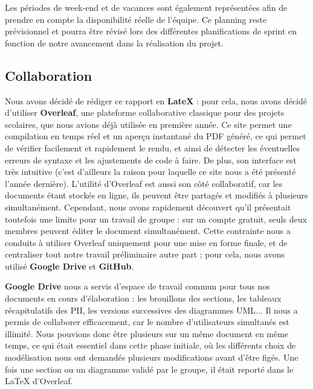 \documentclass[12pt,a4paper]{article}
\begin{document}
Les périodes de week-end et de vacances sont également représentées afin de
prendre en compte la disponibilité réelle de l'équipe. Ce planning reste
prévisionnel et pourra être révisé lors des différentes planifications de sprint en fonction de notre avancement dans la réalisation du projet.

\subsection{Collaboration}
Nous avons décidé de rédiger ce rapport en \textbf{LateX} : pour cela, nous avons décidé d’utiliser \textbf{Overleaf}, une plateforme collaborative classique pour des projets scolaires, que nous avions déjà utilisée en première année. Ce site permet une compilation en temps réel et un aperçu instantané du PDF généré, ce qui permet de vérifier facilement et rapidement le rendu, et ainsi de détecter les éventuelles erreurs de syntaxe et les ajustements de code à faire. De plus, son interface est très intuitive (c’est d’ailleurs la raison pour laquelle ce site nous a été présenté l’année dernière).
L’utilité d’Overleaf est aussi son côté collaboratif, car les documents étant stockés en ligne, ils peuvent être partagés et modifiés à plusieurs simultanément. Cependant, nous avons rapidement découvert qu'il présentait toutefois une limite pour un travail de groupe : sur un compte gratuit, seuls deux membres peuvent éditer le document simultanément. Cette contrainte nous a conduits à utiliser Overleaf uniquement pour une mise en forme finale, et de centraliser tout notre travail préliminaire autre part ; pour cela, nous avons utilisé \textbf{Google Drive} et \textbf{GitHub}.
\newline

\textbf{Google Drive} nous a servis d'espace de travail commun pour tous nos documents en cours d'élaboration : les brouillons des sections, les tableaux récapitulatifs des PII, les versions successives des diagrammes UML... Il nous a permis de collaborer efficacement, car le nombre d'utilisateurs simultanés est illimité. Nous pouvions donc être plusieurs sur un même document en même temps, ce qui était essentiel dans cette phase initiale, où les différents choix de modélisation nous ont demandés plusieurs modifications avant d'être figés. Une fois une section ou un diagramme validé par le groupe, il était reporté dans le LaTeX d'Overleaf.
\newline 
\end{document}
